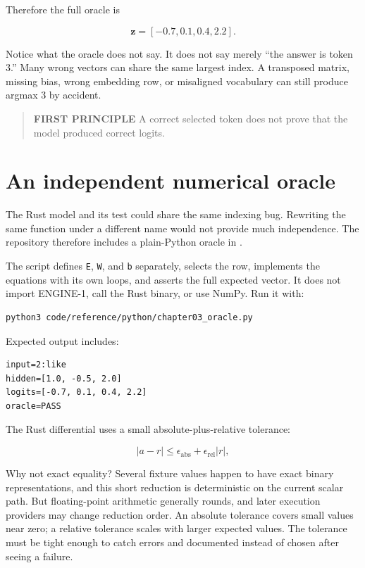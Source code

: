 Therefore the full oracle is

\begin{equation}
\mathbf{z}=[-0.7,0.1,0.4,2.2].
\end{equation}

Notice what the oracle does not say. It does not say merely ``the answer
is token 3.'' Many wrong vectors can share the same largest index. A
transposed matrix, missing bias, wrong embedding row, or misaligned
vocabulary can still produce argmax 3 by accident.

\begin{quote}
\textbf{FIRST PRINCIPLE} A correct selected token does not prove that
the model produced correct logits.
\end{quote}

\section{An independent numerical
oracle}\label{an-independent-numerical-oracle}

The Rust model and its test could share the same indexing bug. Rewriting
the same function under a different name would not provide much
independence. The repository therefore includes a plain-Python oracle in
\texttt{}.

The script defines \texttt{E}, \texttt{W}, and \texttt{b} separately,
selects the row, implements the equations with its own loops, and
asserts the full expected vector. It does not import ENGINE-1, call the
Rust binary, or use NumPy. Run it with:

\begin{verbatim}
python3 code/reference/python/chapter03_oracle.py
\end{verbatim}

Expected output includes:

\begin{verbatim}
input=2:like
hidden=[1.0, -0.5, 2.0]
logits=[-0.7, 0.1, 0.4, 2.2]
oracle=PASS
\end{verbatim}

The Rust differential uses a small absolute-plus-relative tolerance:

\begin{equation}
|a-r|\le \epsilon_{\mathrm{abs}}+
\epsilon_{\mathrm{rel}}|r|,
\end{equation}

Why not exact equality? Several fixture values happen to have exact
binary representations, and this short reduction is deterministic on the
current scalar path. But floating-point arithmetic generally rounds, and
later execution providers may change reduction order. An absolute
tolerance covers small values near zero; a relative tolerance scales
with larger expected values. The tolerance must be tight enough to catch
errors and documented instead of chosen after seeing a failure.

